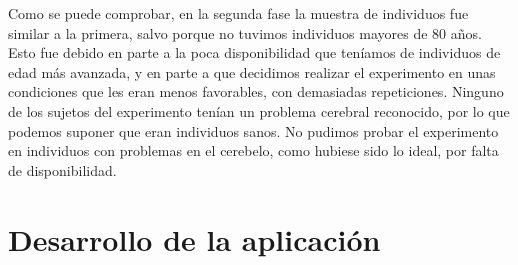 \documentclass[a4paper,11pt, oneside]{book}
\begin{document}
Como se puede comprobar, en la segunda fase la muestra de individuos fue similar a la primera, salvo porque no tuvimos individuos mayores de 80 años. Esto fue debido en parte a la poca disponibilidad que teníamos de individuos de edad más avanzada, y en parte a que decidimos realizar el experimento en unas condiciones que les eran menos favorables, con demasiadas repeticiones. Ninguno de los sujetos del experimento tenían un problema cerebral reconocido, por lo que podemos suponer que eran individuos sanos. No pudimos probar el experimento en individuos con problemas en el cerebelo, como hubiese sido lo ideal, por falta de disponibilidad.

\section{Desarrollo de la aplicación}
\end{document}
